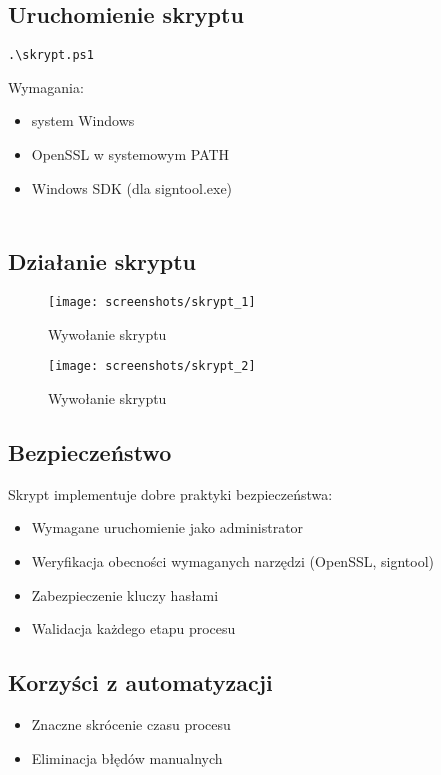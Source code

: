 \documentclass{article}
\begin{document}
\subsection{Uruchomienie skryptu}
\begin{lstlisting}[style=command, caption=Uruchomienie skryptu]
.\skrypt.ps1 
\end{lstlisting}
Wymagania:
\begin{itemize}
    \item system Windows
    \item OpenSSL w systemowym PATH
    \item Windows SDK (dla signtool.exe) \\ \\
\end{itemize}

\subsection{Działanie skryptu}

\begin{figure}[H]
    \centering
    \texttt{[image: screenshots/skrypt\_1]} %
    \caption{Wywołanie skryptu}
    \label{fig:skrypt_exec}
\end{figure}

\begin{figure}[H]
    \centering
    \texttt{[image: screenshots/skrypt\_2]} %
    \caption{Wywołanie skryptu}
    \label{fig:skrypt_exec}
\end{figure}

\subsection{Bezpieczeństwo}
Skrypt implementuje dobre praktyki bezpieczeństwa:
\begin{itemize}
    \item Wymagane uruchomienie jako administrator
    \item Weryfikacja obecności wymaganych narzędzi (OpenSSL, signtool)
    \item Zabezpieczenie kluczy hasłami
    \item Walidacja każdego etapu procesu
\end{itemize}

\subsection{Korzyści z automatyzacji}
\begin{itemize}
    \item Znaczne skrócenie czasu procesu
    \item Eliminacja błędów manualnych \\
\end{itemize}
\end{document}
